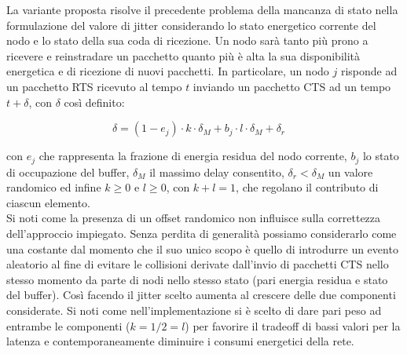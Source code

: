 \documentclass[binding=0.6cm,TFA]{sapthesis}
\begin{document}
La variante proposta risolve il precedente problema della mancanza di stato nella formulazione del valore di jitter considerando lo stato energetico
corrente del nodo e lo stato della sua coda di ricezione. Un nodo sarà tanto più prono a ricevere e reinstradare un pacchetto quanto
più è alta la sua disponibilità energetica e di ricezione di nuovi pacchetti. In particolare, un nodo $j$ risponde ad un pacchetto RTS ricevuto al
tempo $t$ inviando un pacchetto CTS ad un tempo $t+\delta$, con $\delta$ così definito:

\begin{equation}
    \delta= (1-e_{j}) \cdot k \cdot \delta_{M} + b_{j} \cdot l \cdot \delta_{M} + \delta_{r} \quad
\end{equation}

con $e_{j}$ che rappresenta la frazione di energia residua del nodo corrente, $b_{j}$ lo stato di occupazione del buffer, $\delta_{M}$ il massimo
delay consentito, $\delta_{r} < \delta_{M}$ un valore randomico ed infine $k \geq 0$ e $l \geq 0$, con $k+l=1$, che regolano il contributo di
ciascun elemento.\\

Si noti come la presenza di un offset randomico non influisce sulla correttezza dell'approccio impiegato. Senza perdita di generalità possiamo considerarlo come una
costante dal momento che il suo unico scopo è quello di introdurre un evento aleatorio al fine di evitare le collisioni derivate dall'invio di pacchetti CTS
nello stesso momento da parte di nodi nello stesso stato (pari energia residua e stato del buffer). Così facendo il jitter scelto aumenta al crescere
delle due componenti considerate. Si noti come nell'implementazione si è scelto di dare pari peso ad entrambe le componenti ($k=1/2=l$) per favorire il
tradeoff di bassi valori per la latenza e contemporaneamente diminuire i consumi energetici della rete.\\
\end{document}
